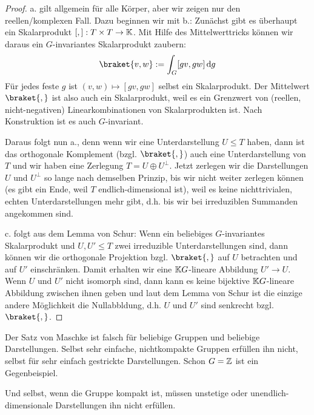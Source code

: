 \begin{proof}
a. gilt allgemein für alle Körper, aber wir zeigen nur den reellen/komplexen Fall. Dazu beginnen wir mit b.: Zunächst gibt es überhaupt ein Skalarprodukt $[,]: T\times T\to\mathbb{K}$. Mit Hilfe des Mittelwerttricks können wir daraus ein $G$-invariantes Skalarprodukt zaubern:
\[\braket{v,w} := \int_G [gv,gw] \dd g\]
Für jedes feste $g$ ist $(v,w) \mapsto [gv,gw]$ selbst ein Skalarprodukt. Der Mittelwert $\braket{,}$ ist also auch ein Skalarprodukt, weil es ein Grenzwert von (reellen, nicht-negativen) Linearkombinationen von Skalarprodukten ist. Nach Konstruktion ist es auch $G$-invariant.

\smallbreak
Daraus folgt nun a., denn wenn wir eine Unterdarstellung $U\leq T$ haben, dann ist das orthogonale Komplement (bzgl. $\braket{,}$) auch eine Unterdarstellung von $T$ und wir haben eine Zerlegung $T=U\oplus U^\perp$. Jetzt zerlegen wir die Darstellungen $U$ und $U^\perp$ so lange nach demselben Prinzip, bis wir nicht weiter zerlegen können (es gibt ein Ende, weil $T$ endlich-dimensional ist), weil es keine nichttrivialen, echten Unterdarstellungen mehr gibt, d.h. bis wir bei irreduziblen Summanden angekommen sind.

\smallbreak
c. folgt aus dem Lemma von Schur: Wenn ein beliebiges $G$-invariantes Skalarprodukt und $U,U'\leq T$ zwei irreduzible Unterdarstellungen sind, dann können wir die orthogonale Projektion bzgl. $\braket{,}$ auf $U$ betrachten und auf $U'$ einschränken. Damit erhalten wir eine $\mathbb{K} G$-lineare Abbildung $U'\to U$. Wenn $U$ und $U'$ nicht isomorph sind, dann kann es keine bijektive $\mathbb{K} G$-lineare Abbildung zwischen ihnen geben und laut dem Lemma von Schur ist die einzige andere Möglichkeit die Nullabbldung, d.h. $U$ und $U'$ sind senkrecht bzgl. $\braket{,}$.
\end{proof}

\begin{remark}
Der Satz von Maschke ist falsch für beliebige Gruppen und beliebige Darstellungen. Selbst sehr einfache, nichtkompakte Gruppen erfüllen ihn nicht, selbst für sehr einfach gestrickte Darstellungen. Schon $G=\mathbb{Z}$ ist ein Gegenbeispiel.

Und selbst, wenn die Gruppe kompakt ist, müssen unstetige oder unendlich-dimensionale Darstellungen ihn nicht erfüllen.
\end{remark}


